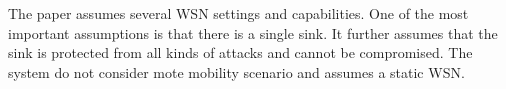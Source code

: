 \documentclass[conference,manuscript]{IEEEtran}
\newcommand{\notedme}[1]{\raisebox{0pt}[0pt][0pt]{\pdfcomment[open=true,color=blue]{#1}}}
\begin{document}



The paper assumes several WSN settings and capabilities.
One of the most important assumptions is that there is a single  sink. 
It further assumes that the sink is protected from all kinds of attacks and cannot be compromised. 
The system do not consider mote mobility scenario and assumes a static WSN.


\end{document}
